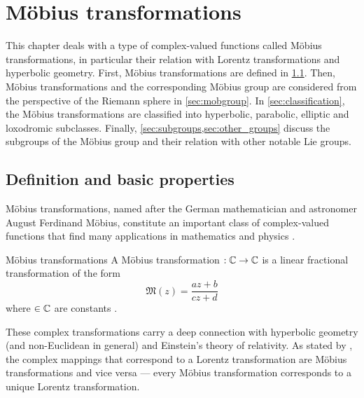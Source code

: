 \chapter{Möbius transformations}
\label{chap:moebius_transforms}
This chapter deals with a type of complex-valued functions called Möbius transformations, in particular their relation with Lorentz transformations and hyperbolic geometry. First, Möbius transformations are defined in \cref{sec:moebius_def}. Then, Möbius transformations and the corresponding Möbius group are considered from the perspective of the Riemann sphere in \cref{sec:mobgroup}. In \cref{sec:classification}, the Möbius transformations are classified into hyperbolic, parabolic, elliptic and loxodromic subclasses. Finally, \cref{sec:subgroups,sec:other_groups} discuss the subgroups of the Möbius group and their relation with other notable Lie groups.

\section{Definition and basic properties}
\label{sec:moebius_def}
Möbius transformations, named after the German mathematician and astronomer August Ferdinand Möbius, constitute an important class of complex-valued functions that find many applications in mathematics and physics \cite{Needham1997}.
\begin{thmblock}{Möbius transformations}
    A Möbius transformation $:\mathbb{C}\to\mathbb{C}$ is a linear fractional transformation of the form 
        \begin{equation}
            \mathfrak{M}(z) = \frac{az + b}{cz + d} \label{eq:mobius}
        \end{equation}
    where  \(\in \mathbb{C} \) are constants \cite{Needham1997}.
\end{thmblock}
These complex transformations carry a deep connection with hyperbolic geometry (and non-Euclidean in general) and Einstein's theory of relativity. As stated by \citet{Needham1997}, the complex mappings that correspond to a Lorentz transformation are Möbius transformations and vice versa --- every Möbius transformation corresponds to a unique Lorentz transformation.

